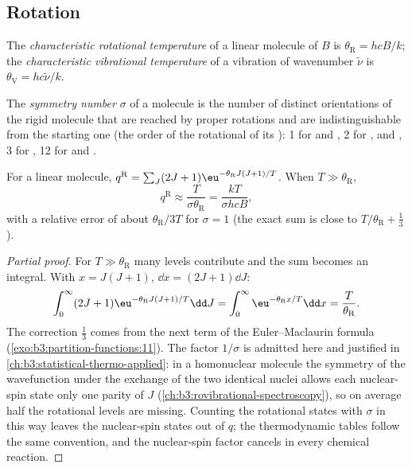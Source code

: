 \subsection*{Rotation}

\begin{definition}\label{def:b3:partition-functions:characteristic-temperature}
The \emph{characteristic rotational temperature}
of a linear molecule of  $B$ is $\theta_{\mathrm R} =
hcB/k$; the \emph{characteristic vibrational temperature}
of a vibration of wavenumber $\tilde\nu$ is $\theta_{\mathrm V} =
hc\tilde\nu/k$.
\end{definition}

\begin{definition}\label{def:b3:partition-functions:symmetry-number}
The \emph{symmetry number} $\sigma$ of a molecule is the
number of distinct orientations of the rigid molecule that are reached by
proper rotations and are indistinguishable from the starting one (the order of
the rotational  of its ): 1 for  and , 2 for ,
 and , 3 for , 12 for  and .
\end{definition}

\begin{proposition}\label{prop:b3:partition-functions:q-rot}
For a linear molecule, $q^{\mathrm R} = \sum_J(2J+1)\eu^{-\theta_{\mathrm R}J(J+1)/T}$. When $T \gg
\theta_{\mathrm R}$,
\[
  q^{\mathrm R} \approx \frac{T}{\sigma\theta_{\mathrm R}} = \frac{kT}{\sigma hcB},
\]
with a relative error of about $\theta_{\mathrm R}/3T$ for $\sigma = 1$ (the exact sum is close
to $T/\theta_{\mathrm R} + \frac13$).
\end{proposition}

\begin{proof}[Partial proof]
For $T \gg \theta_{\mathrm R}$ many levels contribute and the sum becomes an integral.
With $x = J(J+1)$, $\dd x = (2J+1)\dd J$:
\[
  \int_0^\infty(2J+1)\eu^{-\theta_{\mathrm R}J(J+1)/T}\dd J = \int_0^\infty\eu^{-\theta_{\mathrm R}x/T}\dd x
  = \frac{T}{\theta_{\mathrm R}}.
\]
The correction $\frac13$ comes from the next term of the Euler--Maclaurin formula
(\cref{exo:b3:partition-functions:11}). The factor $1/\sigma$ is admitted here and
justified in \cref{ch:b3:statistical-thermo-applied}: in a homonuclear molecule
the symmetry of the wavefunction under the exchange of the two identical nuclei
allows each nuclear-spin state only one parity of $J$
(\cref{ch:b3:rovibrational-spectroscopy}), so on average half the rotational
levels are missing. Counting the rotational states with $\sigma$ in this way
leaves the nuclear-spin states out of $q$; the thermodynamic tables follow the
same convention, and the nuclear-spin factor cancels in every chemical
reaction.
\end{proof}

